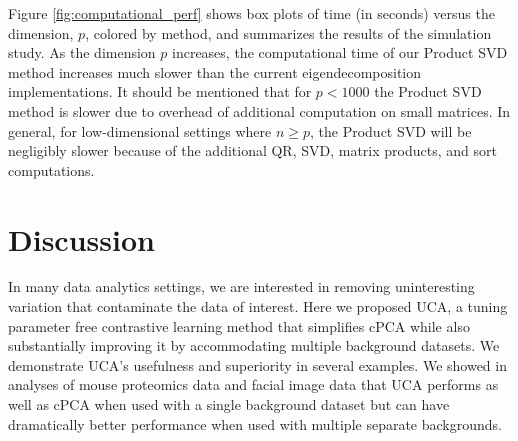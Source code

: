 \documentclass[12pt]{article}
\begin{document}
Figure \ref{fig:computational_perf} shows box plots of time (in seconds) versus the dimension, $p$, colored by method, and summarizes the results of the simulation study. As the dimension $p$ increases, the computational time of our Product SVD method increases much slower than the current eigendecomposition implementations. It should be mentioned that for $p < 1000$ the Product SVD method is slower due to overhead of additional computation on small matrices. In general, for low-dimensional settings where $n \geq p$, the Product SVD will be negligibly slower because of the additional QR, SVD, matrix products, and sort computations. 


\section{Discussion}
In many data analytics settings, we are interested in removing uninteresting variation that contaminate the data of interest.
Here we proposed UCA, a tuning parameter free contrastive learning method that simplifies cPCA while also substantially improving it by accommodating multiple background datasets. We demonstrate UCA's usefulness and superiority in several examples. %
We showed in analyses of mouse proteomics data and facial image data that UCA performs as well as cPCA when used with a single background dataset but can have dramatically better performance when used with multiple separate backgrounds. %
\end{document}
